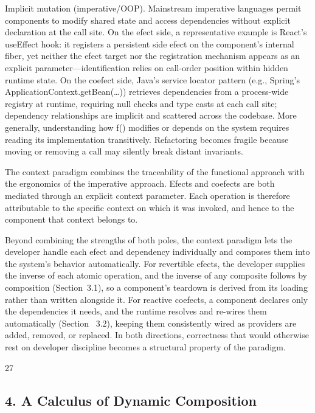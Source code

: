 \documentclass[
  10
]{article}
\begin{document}
Implicit mutation (imperative/OOP). Mainstream imperative languages
permit components to modify shared state and access dependencies without
explicit declaration at the call site. On the efect side, a
representative example is React's useEffect hook: it registers a
persistent side efect on the component's internal fiber, yet neither the
efect target nor the registration mechanism appears as an explicit
parameter---identification relies on call-order position within hidden
runtime state. On the coefect side, Java's service locator pattern
(e.g., Spring's ApplicationContext.getBean(\ldots)) retrieves
dependencies from a process-wide registry at runtime, requiring null
checks and type casts at each call site; dependency relationships are
implicit and scattered across the codebase. More generally,
understanding how f() modifies or depends on the system requires reading
its implementation transitively. Refactoring becomes fragile because
moving or removing a call may silently break distant invariants.

The context paradigm combines the traceability of the functional
approach with the ergonomics of the imperative approach. Efects and
coefects are both mediated through an explicit context parameter. Each
operation is therefore attributable to the specific context on which it
was invoked, and hence to the component that context belongs to.

Beyond combining the strengths of both poles, the context paradigm lets
the developer handle each efect and dependency individually and composes
them into the system's behavior automatically. For revertible efects,
the developer supplies the inverse of each atomic operation, and the
inverse of any composite follows by composition (Section~3.1), so a
component's teardown is derived from its loading rather than written
alongside it. For reactive coefects, a component declares only the
dependencies it needs, and the runtime resolves and re-wires them
automatically (Section~ 3.2), keeping them consistently wired as
providers are added, removed, or replaced. In both directions,
correctness that would otherwise rest on developer discipline becomes a
structural property of the paradigm.

27

\subsection{4. A Calculus of Dynamic
Composition}\label{a-calculus-of-dynamic-composition}
\end{document}

